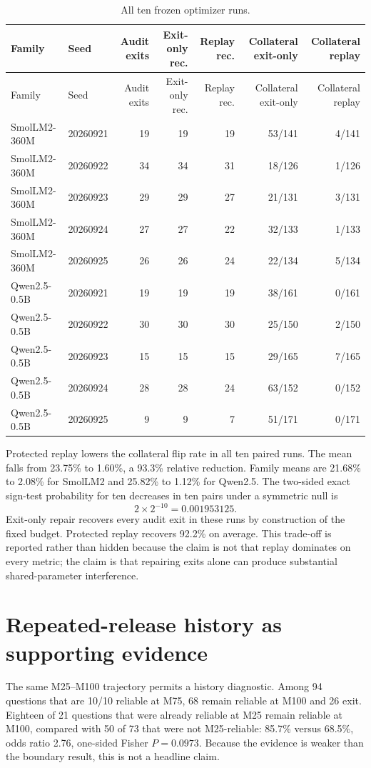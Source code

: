 \documentclass[11pt,letterpaper]{article}
\theoremstyle{plain}
\newcommand{\1}{\mathbf 1}
\begin{document}
\begingroup
\scriptsize
\setlength{\tabcolsep}{4pt}
\begin{longtable}{@{}llrrrrr@{}}
\caption{All ten frozen optimizer runs.}\label{tab:s_tenruns}\\
\toprule
Family & Seed & Audit exits & Exit-only rec. & Replay rec. & Collateral exit-only & Collateral replay \\
\midrule
\endfirsthead
\toprule
Family & Seed & Audit exits & Exit-only rec. & Replay rec. & Collateral exit-only & Collateral replay \\
\midrule
\endhead
SmolLM2-360M & 20260921 & 19 & 19 & 19 & 53/141 & 4/141 \\
SmolLM2-360M & 20260922 & 34 & 34 & 31 & 18/126 & 1/126 \\
SmolLM2-360M & 20260923 & 29 & 29 & 27 & 21/131 & 3/131 \\
SmolLM2-360M & 20260924 & 27 & 27 & 22 & 32/133 & 1/133 \\
SmolLM2-360M & 20260925 & 26 & 26 & 24 & 22/134 & 5/134 \\
Qwen2.5-0.5B & 20260921 & 19 & 19 & 19 & 38/161 & 0/161 \\
Qwen2.5-0.5B & 20260922 & 30 & 30 & 30 & 25/150 & 2/150 \\
Qwen2.5-0.5B & 20260923 & 15 & 15 & 15 & 29/165 & 7/165 \\
Qwen2.5-0.5B & 20260924 & 28 & 28 & 24 & 63/152 & 0/152 \\
Qwen2.5-0.5B & 20260925 & 9 & 9 & 7 & 51/171 & 0/171 \\
\bottomrule
\end{longtable}
\endgroup

Protected replay lowers the collateral flip rate in all ten paired runs. The mean falls from 23.75\% to 1.60\%, a 93.3\% relative reduction. Family means are 21.68\% to 2.08\% for SmolLM2 and 25.82\% to 1.12\% for Qwen2.5. The two-sided exact sign-test probability for ten decreases in ten pairs under a symmetric null is
\begin{equation}
 2\times 2^{-10}=0.001953125.
\label{eq:s_signtest}
\end{equation}
Exit-only repair recovers every audit exit in these runs by construction of the fixed budget. Protected replay recovers 92.2\% on average. This trade-off is reported rather than hidden because the claim is not that replay dominates on every metric; the claim is that repairing exits alone can produce substantial shared-parameter interference.

\section{Repeated-release history as supporting evidence}
The same M25--M100 trajectory permits a history diagnostic. Among 94 questions that are 10/10 reliable at M75, 68 remain reliable at M100 and 26 exit. Eighteen of 21 questions that were already reliable at M25 remain reliable at M100, compared with 50 of 73 that were not M25-reliable: 85.7\% versus 68.5\%, odds ratio 2.76, one-sided Fisher $P=0.0973$. Because the evidence is weaker than the boundary result, this is not a headline claim.
\end{document}
